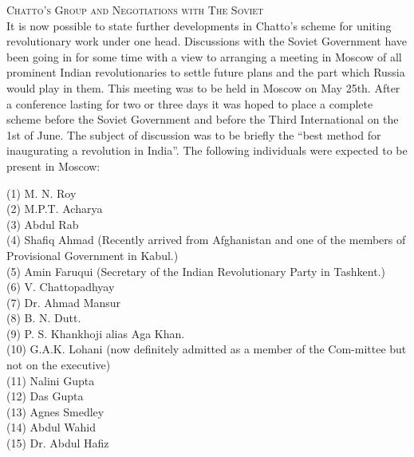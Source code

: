 \textsc{Chatto's Group and Negotiations with The Soviet}\\

It is now possible to state further developments in Chatto’s scheme for uniting revolutionary work under one head. Discussions with the Soviet Government have been going in for some time with a view to arranging a meeting in Moscow of all prominent Indian revolutionaries to settle future plans and the part which Russia would play in them. This meeting was to be held in Moscow on May 25th. After a conference 
lasting for two or three days it was hoped to place a complete scheme before the Soviet Government and before the Third International on the 1st of June. The subject of discussion was to be briefly the “best method for inaugurating a revolution in India”. The following individuals were expected to be present in Moscow: 

\noindent(1) M. N. Roy \\
(2) M.P.T. Acharya \\
(3) Abdul Rab \\
(4) Shafiq Ahmad (Recently arrived from Afghanistan and one of the members of Provisional Government in Kabul.) \\
(5) Amin Faruqui (Secretary of the Indian Revolutionary Party in Tashkent.) \\
(6) V. Chattopadhyay \\
(7) Dr. Ahmad Mansur \\
(8) B. N. Dutt. \\
(9) P. S. Khankhoji alias Aga Khan.\\ 
(10) G.A.K. Lohani (now definitely admitted as a member of the Com-mittee but not on the executive) \\
(11) Nalini Gupta \\
(12) Das Gupta \\
(13) Agnes Smedley \\
(14) Abdul Wahid \\
(15) Dr. Abdul Hafiz \\


